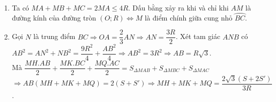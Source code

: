 \begin{ex}
{\begin{enumerate}
$\Rightarrow MC=DA\Rightarrow MA=MD+DA=MB+MC$.
\item Ta có $MA+MB+MC=2MA\leq 4R$. Dấu bằng xảy ra khi và chỉ khi $AM$ là đường kính của đường tròn $(O;R)\Leftrightarrow M$ là điểm chính giữa cung nhỏ $\wideparen{BC}$.
\item Gọi $N$ là trung điểm $BC\Rightarrow OA=\dfrac{2}{3}AN\Rightarrow AN=\dfrac{3R}{2}$. Xét tam giác $ANB$ có\\
$AB^{2}=AN^{2}+NB^{2}=\dfrac{9R^{2}}{4}+\dfrac{AB^{2}}{4}\Rightarrow AB^{2}=3R^{2}\Rightarrow AB=R\sqrt{3}$.\\
Mà $\dfrac{MH.AB}{2}+\dfrac{MK.BC}{2}+\dfrac{MQ.AC}{2}=S_{\Delta MAB}+S_{\Delta MBC}+S_{\Delta MAC}$\\
$\Rightarrow AB(MH+MK+MQ)=2(S+S')\Rightarrow MH+MK+MQ=\dfrac{2\sqrt{3}(S+2S')}{3R}$.
\end{enumerate}
}
\end{ex}
